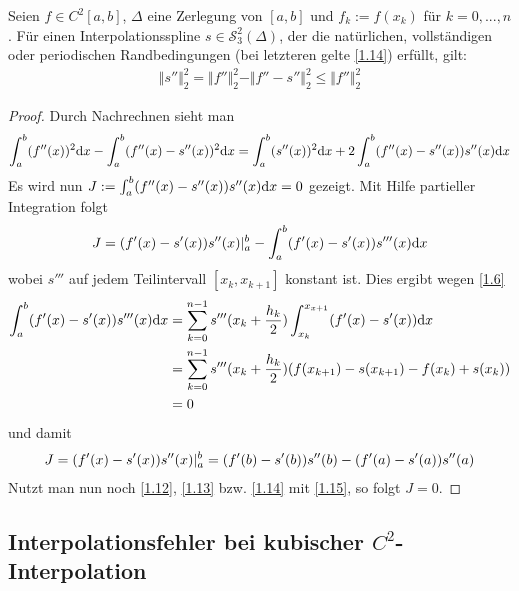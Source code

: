 \begin{proposition}
	Seien $f\in C^2[a,b]$, $\Delta$ eine Zerlegung von $[a,b]$ und $f_k:=f(x_k)$ für $k=0,...,n$. Für einen Interpolationsspline $s\in\mathcal{S}^2_3(\Delta)$, der die natürlichen, vollständigen oder periodischen Randbedingungen (bei letzteren gelte \cref{1.14}) erfüllt, gilt:
	\begin{align}
		\Vert s''\Vert^2_2 = \Vert f''\Vert_2^2 - \Vert f''-s''\Vert_2^2 \le \Vert f''\Vert_2^2
	\end{align}
\end{proposition}
\begin{proof}
	Durch Nachrechnen sieht man
	\begin{align}
		\int_a^b (f''(x))^2\mathrm{d} x-\int_a^b (f''(x)-s''(x))^2\mathrm{d} x = \int_a^b (s''(x))^2\mathrm{d} x + 2\int_a^b (f''(x)-s''(x))s''(x)\mathrm{d} x \notag
	\end{align}
	Es wird nun $J:=\int_a^b (f''(x)-s''(x))s''(x)\mathrm{d} x=0$ gezeigt. Mit Hilfe partieller Integration folgt
	\begin{align}
		J=(f'(x)-s'(x))s''(x)\vert_a^b - \int_a^b (f'(x)-s'(x))s'''(x)\mathrm{d} x\notag
	\end{align}
	wobei $s'''$ auf jedem Teilintervall $[x_k,x_{k+1}]$ konstant ist. Dies ergibt wegen \cref{1.6}
	\begin{align}
		\int_a^b (f'(x)-s'(x))s'''(x)\mathrm{d} x &= \sum_{k=0}^{n-1} s'''(x_k+\frac{h_k}{2})\int_{x_k}^{x_{x+1}}(f'(x)-s'(x))\mathrm{d} x \notag \\
		&= \sum_{k=0}^{n-1} s'''(x_k+\frac{h_k}{2})(f(x_{k+1})-s(x_{k+1})-f(x_k)+s(x_k)) \notag \\
		&= 0 \notag
	\end{align}
	und damit 
	\begin{align}
		J=(f'(x)-s'(x))s''(x)\vert_a^b = (f'(b)-s'(b))s''(b)-(f'(a)-s'(a))s''(a)\notag
	\end{align}
	Nutzt man nun noch \cref{1.12}, \cref{1.13} bzw. \cref{1.14} mit \cref{1.15}, so folgt $J=0$.
\end{proof}

\subsection{Interpolationsfehler bei kubischer $C^2$-Interpolation}


